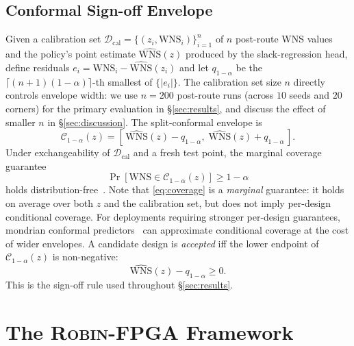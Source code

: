 \documentclass[journal]{IEEEtran}
\begin{document}
\subsection{Conformal Sign-off Envelope}
Given a calibration set $\mathcal{D}_{\text{cal}} = \{(z_i, \mathrm{WNS}_i)\}_{i=1}^{n}$ of $n$ post-route WNS values and the policy's point estimate $\widehat{\mathrm{WNS}}(z)$ produced by the slack-regression head, define residuals $e_i = \mathrm{WNS}_i - \widehat{\mathrm{WNS}}(z_i)$ and let $q_{1-\alpha}$ be the $\lceil (n+1)(1-\alpha) \rceil$-th smallest of $\{|e_i|\}$. The calibration set size $n$ directly controls envelope width: we use $n = 200$ post-route runs (across $10$ seeds and $20$ corners) for the primary evaluation in \S\ref{sec:results}, and discuss the effect of smaller $n$ in \S\ref{sec:discussion}. The split-conformal envelope is
\begin{equation}
\mathcal{C}_{1-\alpha}(z) = \left[\, \widehat{\mathrm{WNS}}(z) - q_{1-\alpha},\; \widehat{\mathrm{WNS}}(z) + q_{1-\alpha}\, \right].
\label{eq:conformal}
\end{equation}
Under exchangeability of $\mathcal{D}_{\text{cal}}$ and a fresh test point, the marginal coverage guarantee
\begin{equation}
\Pr\!\left[\mathrm{WNS} \in \mathcal{C}_{1-\alpha}(z)\right] \geq 1 - \alpha
\label{eq:coverage}
\end{equation}
holds distribution-free~\cite{vovk2022random,angelopoulos2023conformal}. Note that \eqref{eq:coverage} is a \emph{marginal} guarantee: it holds on average over both $z$ and the calibration set, but does not imply per-design conditional coverage. For deployments requiring stronger per-design guarantees, mondrian conformal predictors~\cite{vovk2022random} can approximate conditional coverage at the cost of wider envelopes. A candidate design is \emph{accepted} iff the lower endpoint of $\mathcal{C}_{1-\alpha}(z)$ is non-negative:
\begin{equation}
\widehat{\mathrm{WNS}}(z) - q_{1-\alpha} \geq 0.
\label{eq:accept}
\end{equation}
This is the sign-off rule used throughout \S\ref{sec:results}.

\section{The \textsc{Robin-FPGA} Framework}
\label{sec:method}
\end{document}
